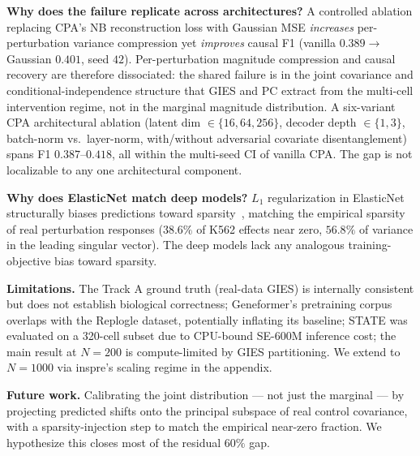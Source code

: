 \documentclass{article}
\begin{document}
\textbf{Why does the failure replicate across architectures?} A controlled ablation replacing CPA's NB reconstruction loss with Gaussian MSE \emph{increases} per-perturbation variance compression yet \emph{improves} causal F1 (vanilla $0.389 \to$ Gaussian $0.401$, seed $42$). Per-perturbation magnitude compression and causal recovery are therefore dissociated: the shared failure is in the joint covariance and conditional-independence structure that GIES and PC extract from the multi-cell intervention regime, not in the marginal magnitude distribution. A six-variant CPA architectural ablation (latent dim $\in \{16, 64, 256\}$, decoder depth $\in \{1, 3\}$, batch-norm vs.\ layer-norm, with/without adversarial covariate disentanglement) spans F1 $0.387$--$0.418$, all within the multi-seed CI of vanilla CPA. The gap is not localizable to any one architectural component.

\textbf{Why does ElasticNet match deep models?} $L_1$ regularization in ElasticNet structurally biases predictions toward sparsity~\citep{zou2005elasticnet}, matching the empirical sparsity of real perturbation responses ($38.6\%$ of K562 effects near zero, $56.8\%$ of variance in the leading singular vector). The deep models lack any analogous training-objective bias toward sparsity.

\textbf{Limitations.} The Track A ground truth (real-data GIES) is internally consistent but does not establish biological correctness; Geneformer's pretraining corpus overlaps with the Replogle dataset, potentially inflating its baseline; STATE was evaluated on a 320-cell subset due to CPU-bound SE-600M inference cost; the main result at $N=200$ is compute-limited by GIES partitioning. We extend to $N=1000$ via inspre's scaling regime in the appendix.

\textbf{Future work.} Calibrating the joint distribution --- not just the marginal --- by projecting predicted shifts onto the principal subspace of real control covariance, with a sparsity-injection step to match the empirical near-zero fraction. We hypothesize this closes most of the residual $60\%$ gap.

\end{document}
